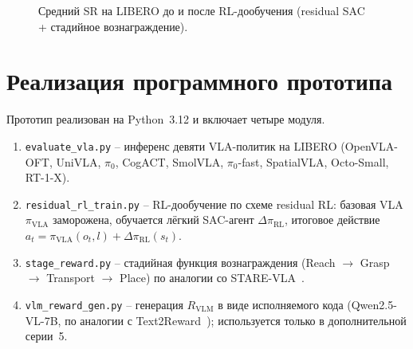 \begin{figure}[htbp]
    \centering
    \caption{Средний SR на LIBERO до и после RL-дообучения (residual SAC + стадийное вознаграждение).}
    \label{fig:vla_rl_ladder}
\end{figure}

\section{Реализация программного прототипа}
\label{sec:implementation}

    Прототип реализован на Python~3.12 и включает четыре модуля.

\begin{enumerate}
    \item \texttt{evaluate\_vla.py} -- инференс девяти VLA-политик на LIBERO (OpenVLA-OFT, UniVLA, $\pi_0$, CogACT, SmolVLA, $\pi_0$-fast, SpatialVLA, Octo-Small, RT-1-X).
    \item \texttt{residual\_rl\_train.py} -- RL-дообучение по схеме residual RL: базовая VLA $\pi_{\text{VLA}}$ заморожена, обучается лёгкий SAC-агент $\Delta\pi_{\text{RL}}$, итоговое действие $a_t = \pi_{\text{VLA}}(o_t, l) + \Delta\pi_{\text{RL}}(s_t)$.
    \item \texttt{stage\_reward.py} -- стадийная функция вознаграждения (Reach $\to$ Grasp $\to$ Transport $\to$ Place) по аналогии со STARE-VLA~\cite{starevla2025}.
    \item \texttt{vlm\_reward\_gen.py} -- генерация $R_{\text{VLM}}$ в виде исполняемого кода (Qwen2.5-VL-7B, по аналогии с Text2Reward~\cite{xie2024text2reward}); используется только в дополнительной серии~5.
\end{enumerate}

